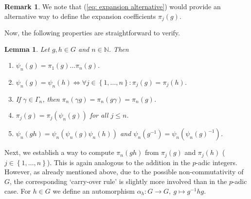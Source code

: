 \documentclass[titlepage,reqno,10pt]{amsart}
\newtheorem{lemma}[theorem]{Lemma}
\theoremstyle{definition}
\newtheorem{remark}[theorem]{Remark}
\def\N{{\mathbb N}}
\newcommand{\set}[1]{\left\{ #1 \right\}}
\begin{document}
\begin{remark}
We note that (\ref{eq: expansion alternative}) would provide an alternative way to define the expansion coefficients $\pi_j(g)$. 
\end{remark}

Now, the following properties are straightforward to verify.

\begin{lemma}\label{lem: basic properties pi_j}
    Let $g,h\in G$ and $n\in\N$. Then
    \begin{enumerate}
        \item $\psi_n(g) = \pi_1(g)\ldots\pi_n(g)$.
        \item  $\psi_n(g) = \psi_n(h) \iff \forall j\in \set{1,\ldots,n}: \pi_j(g) = \pi_j(h)$.
        \item If $\gamma\in \Gamma_n$, then $\pi_n(\gamma g) = \pi_n(g\gamma) = \pi_n(g)$.
        \item $\pi_j(g) = \pi_j(\psi_n(g))$ for all $j\leq n$.
        \item $\psi_n(gh) = \psi_n(\psi_n(g)\psi_n(h))$ and $\psi_n(g^{-1}) = \psi_n(\psi_n(g)^{-1})$.
    \end{enumerate}
\end{lemma}

Next, we establish a way to compute $\pi_n(gh)$ from $\pi_j(g)$ and $\pi_j(h)$ ($j\in\set{1,\ldots,n}$).
This is again analogous to the addition in the $p$-adic integers. However, as already mentioned above, due to the possible non-commutativity of $G$, the corresponding `carry-over rule' is slightly more involved than in the $p$-adic case. For $h\in G$ we define an automorphism $\alpha_h: G\to G, \: g\mapsto g^{-1}hg$.
\end{document}
